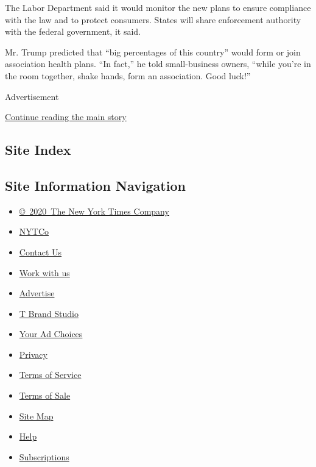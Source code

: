The Labor Department said it would monitor the new plans to ensure
compliance with the law and to protect consumers. States will share
enforcement authority with the federal government, it said.

Mr. Trump predicted that ``big percentages of this country'' would form
or join association health plans. ``In fact,'' he told small-business
owners, ``while you're in the room together, shake hands, form an
association. Good luck!''

Advertisement

\protect\hyperlink{after-bottom}{Continue reading the main story}

\hypertarget{site-index}{%
\subsection{Site Index}\label{site-index}}

\hypertarget{site-information-navigation}{%
\subsection{Site Information
Navigation}\label{site-information-navigation}}

\begin{itemize}
\tightlist
\item
  \href{https://help.nytimes3xbfgragh.onion/hc/en-us/articles/115014792127-Copyright-notice}{©~2020~The
  New York Times Company}
\end{itemize}

\begin{itemize}
\tightlist
\item
  \href{https://www.nytco.com/}{NYTCo}
\item
  \href{https://help.nytimes3xbfgragh.onion/hc/en-us/articles/115015385887-Contact-Us}{Contact
  Us}
\item
  \href{https://www.nytco.com/careers/}{Work with us}
\item
  \href{https://nytmediakit.com/}{Advertise}
\item
  \href{http://www.tbrandstudio.com/}{T Brand Studio}
\item
  \href{https://www.nytimes3xbfgragh.onion/privacy/cookie-policy\#how-do-i-manage-trackers}{Your
  Ad Choices}
\item
  \href{https://www.nytimes3xbfgragh.onion/privacy}{Privacy}
\item
  \href{https://help.nytimes3xbfgragh.onion/hc/en-us/articles/115014893428-Terms-of-service}{Terms
  of Service}
\item
  \href{https://help.nytimes3xbfgragh.onion/hc/en-us/articles/115014893968-Terms-of-sale}{Terms
  of Sale}
\item
  \href{https://spiderbites.nytimes3xbfgragh.onion}{Site Map}
\item
  \href{https://help.nytimes3xbfgragh.onion/hc/en-us}{Help}
\item
  \href{https://www.nytimes3xbfgragh.onion/subscription?campaignId=37WXW}{Subscriptions}
\end{itemize}
